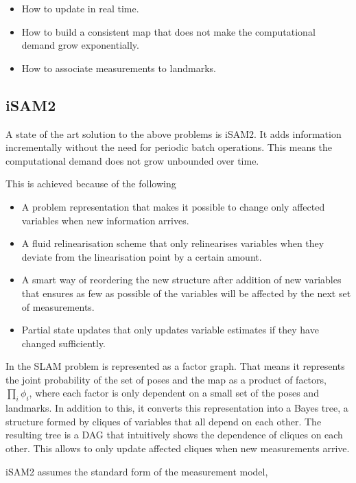 \begin{itemize}
    \item How to update in real time.
    \item How to build a consistent map that does not make the computational demand grow exponentially.
    \item How to associate measurements to landmarks.
\end{itemize}

\subsection{iSAM2}

A state of the art solution to the above problems is \gls{iSAM2}\cite{iSAM2}. It adds information incrementally without the need for periodic batch operations. This means the computational demand does not grow unbounded over time. 

This is achieved because of the following

\begin{itemize}
    \item A problem representation that makes it possible to change only affected variables when new information arrives.
    \item A fluid relinearisation scheme that only relinearises variables when they deviate from the linearisation point by a certain amount.
    \item A smart way of reordering the new structure after addition of new variables that ensures as few as possible of the variables will be affected by the next set of measurements.
    \item Partial state updates that only updates variable estimates if they have changed sufficiently. 
\end{itemize}

In  the SLAM problem is represented as a factor graph. That means it represents the joint probability of the set of poses and the map as a product of factors, $\prod_i \phi_i$, where each factor is only dependent on a small set of the poses and landmarks. In addition to this, it converts this representation into a Bayes tree, a structure formed by cliques of variables that all depend on each other. The resulting tree is a \gls{DAG} that intuitively shows the dependence of cliques on each other. This allows to only update affected cliques when new measurements arrive.

\gls{iSAM2} assumes the standard form of the measurement model,

